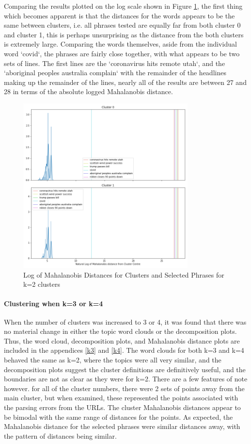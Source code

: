 Comparing the results plotted on the log scale shown in Figure \ref{fig:wordsk2}, the first thing which becomes apparent is that the distances for the words appears to be the same between clusters, i.e. all phrases tested are equally far from both cluster 0 and cluster 1, this is perhaps unsurprising as the distance from the both clusters is extremely large. Comparing the words themselves, aside from the individual word `covid`, the phrases are fairly close together, with what appears to be two sets of lines. The first lines are the `coronavirus hits remote utah`, and the `aboriginal peoples australia complain` with the remainder of the headlines making up the remainder of the lines, nearly all of the results are between 27 and 28 in terms of the absolute logged Mahalanobis distance. 
\begin{figure}[H]
	\centering
	\includegraphics[width=0.8\textwidth]{images/words_kmeans_mahalanobis_distance_k=2.png}
	\caption{Log of Mahalanobis Distances for Clusters and Selected Phrases for k=2 clusters}
	\label{fig:wordsk2}
\end{figure}

\paragraph{Clustering when k=3 or k=4} 
When the number of clusters was increased to 3 or 4, it was found that there was no material change in either the topic word clouds or the decomposition plots. Thus, the word cloud, decomposition plots, and Mahalanobis distance plots are included in the appendices \ref{k3} and \ref{k4}. The word clouds for both k=3 and k=4 behaved the same as k=2, where the topics were all very similar, and the decomposition plots suggest the cluster definitions are definitively useful, and the boundaries are not as clear as they were for k=2.  There are a few features of note however. for all of the cluster numbers, there were 2 sets of points away from the main cluster, but when examined, these represented the points associated with the parsing errors from the URLs. The cluster Mahalanobis distances appear to be bimodal with the same range of distances for the points. As expected, the Mahalanobis distance for the selected phrases were similar distances away, with the pattern of distances being similar.

